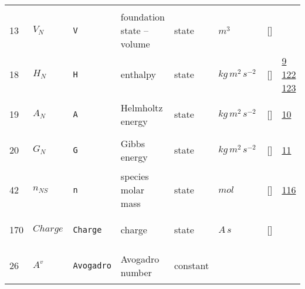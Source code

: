 \begin{longtable}{|p{1cm}|p{3cm}|p{3cm}|p{7cm}|p{3.0cm}|p{3cm}|p{2cm}|p{1cm}|}
             & \\
    13
             & \hypertarget{"v:13"}{ $ {V}{_{N}} $}
             & \verb|V|
             & foundation state -- volume
             & \begin{lay}state \end{lay}
             & $ m^{3} \, $
             & []
             & \\
    18
             & \hypertarget{"v:18"}{ $ {H}{_{N}} $}
             & \verb|H|
             & enthalpy
             & \begin{lay}state \end{lay}
             & $ kg \,m^{2} \,s^{-2} \, $
             & []
             & \hyperlink{"e:9"}{ 9 }
                 \hyperlink{"e:122"}{ 122 }
                 \hyperlink{"e:123"}{ 123 }
                 \\
    19
             & \hypertarget{"v:19"}{ $ {A}{_{N}} $}
             & \verb|A|
             & Helmholtz energy
             & \begin{lay}state \end{lay}
             & $ kg \,m^{2} \,s^{-2} \, $
             & []
             & \hyperlink{"e:10"}{ 10 }
                 \\
    20
             & \hypertarget{"v:20"}{ $ {G}{_{N}} $}
             & \verb|G|
             & Gibbs energy
             & \begin{lay}state \end{lay}
             & $ kg \,m^{2} \,s^{-2} \, $
             & []
             & \hyperlink{"e:11"}{ 11 }
                 \\
    42
             & \hypertarget{"v:42"}{ $ {n}{_{{N S}}} $}
             & \verb|n|
             & species molar mass
             & \begin{lay}state \end{lay}
             & $ mol \, $
             & []
             & \hyperlink{"e:116"}{ 116 }
                 \\
    170
             & \hypertarget{"v:170"}{ $ {Charge}{_{}} $}
             & \verb|Charge|
             & charge
             & \begin{lay}state \end{lay}
             & $ A \,s \, $
             & []
             & \\
    26
             & \hypertarget{"v:26"}{ $ {A^v}{_{}} $}
             & \verb|Avogadro|
             & Avogadro number
             & \begin{lay}constant \end{lay}

\end{longtable}
